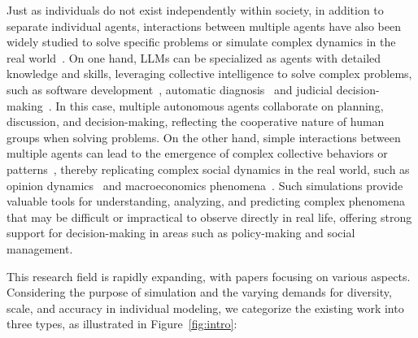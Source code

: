 Just as individuals do not exist independently within society, in addition to separate individual agents, interactions between multiple agents have also been widely studied to solve specific problems or simulate complex dynamics in the real world~\cite{guo2024large,gao2024large}. On one hand, LLMs can be specialized as agents with detailed knowledge and skills, leveraging collective intelligence to solve complex problems, such as software development~\cite{qian2023communicative,hong2023metagpt}, automatic diagnosis~\cite{li2024agent,fan2024ai} and judicial decision-making~\cite{he2024simucourt}. In this case, multiple autonomous agents collaborate on planning, discussion, and decision-making, reflecting the cooperative nature of human groups when solving problems. On the other hand, simple interactions between multiple agents can lead to the emergence of complex collective behaviors or patterns~\cite{schelling1971dynamic,hegselmann2005opinion,chuang2023computational}, thereby replicating complex social dynamics in the real world, such as opinion dynamics~\cite{chuang2023simulating,mou2024unveiling,liu2024skepticism} and macroeconomics phenomena~\cite{li2024econagent}.  Such simulations provide valuable tools for understanding, analyzing, and predicting complex phenomena that may be difficult or impractical to observe directly in real life, offering strong support for decision-making in areas such as policy-making and social management.

This research field is rapidly expanding, with papers focusing on various aspects. Considering the purpose of simulation and the varying demands for diversity, scale, and accuracy in individual modeling, we categorize the existing work into three types, as illustrated in Figure~\ref{fig:intro}: 

